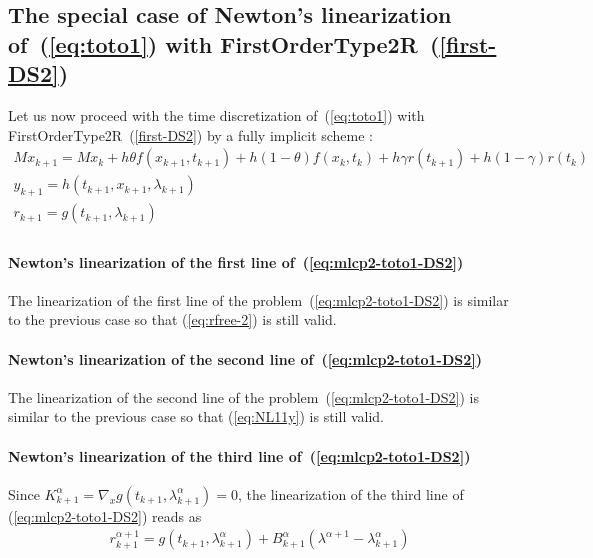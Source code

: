 

\subsection{The special case of Newton's linearization of~(\ref{eq:toto1}) with FirstOrderType2R~(\ref{first-DS2})} 


Let us now proceed with the time discretization of~(\ref{eq:toto1}) with FirstOrderType2R~(\ref{first-DS2})  by a fully implicit scheme : 
\begin{equation}
  \begin{array}{l}
    \label{eq:mlcp2-toto1-DS2}
     M x_{k+1} = M x_{k} +h\theta f(x_{k+1},t_{k+1})+h(1-\theta) f(x_k,t_k) + h \gamma r(t_{k+1})
     + h(1-\gamma)r(t_k)  \\[2mm]
     y_{k+1} =  h(t_{k+1},x_{k+1},\lambda _{k+1}) \\[2mm]
     r_{k+1} = g(t_{k+1},\lambda_{k+1})\\[2mm]
  \end{array}
\end{equation}


 \paragraph{Newton's linearization of the first line of~(\ref{eq:mlcp2-toto1-DS2})} The linearization of the first line of the  problem~(\ref{eq:mlcp2-toto1-DS2}) is similar to the previous case so that (\ref{eq:rfree-2}) is still valid.


 \paragraph{Newton's linearization of the second  line of~(\ref{eq:mlcp2-toto1-DS2})} The linearization of the second line of the  problem~(\ref{eq:mlcp2-toto1-DS2}) is similar to the previous case so that (\ref{eq:NL11y}) is still valid.

 \paragraph{Newton's linearization of the third  line of~(\ref{eq:mlcp2-toto1-DS2})}
Since $ K^{\alpha}_{k+1} = \nabla_xg(t_{k+1},\lambda ^{\alpha}_{k+1}) = 0 $, the linearization of the third line of (\ref{eq:mlcp2-toto1-DS2}) reads as
\begin{equation}
  \label{eq:mlcp2-rrL}
  \begin{array}{l}
    \boxed{r^{\alpha+1}_{k+1} = g(t_{k+1},\lambda ^{\alpha}_{k+1})     + B^{\alpha}_{k+1} ( \lambda^{\alpha+1}-  \lambda^{\alpha}_{k+1} )}       
  \end{array}
\end{equation}


